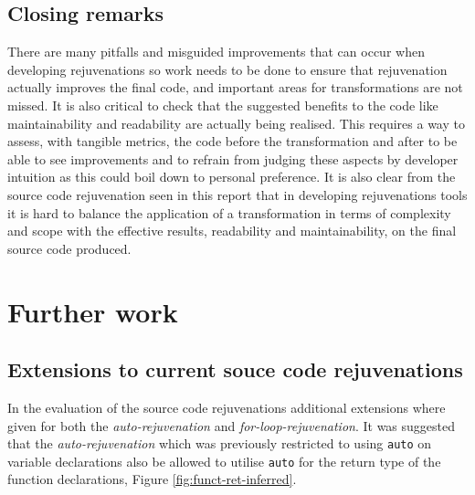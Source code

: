 \documentclass[bsc,frontabs,singlespacing,twoside,parskip,deptreport]{infthesis}
\begin{document}

\subsection{Closing remarks}
There are many pitfalls and misguided improvements that can occur when developing rejuvenations so work needs to be done to ensure that rejuvenation actually improves the final code, and important areas for transformations are not missed. It is also critical to check that the suggested benefits to the code like maintainability and readability are actually being realised. This requires a way to assess, with tangible metrics, the code before the transformation and after to be able to see improvements and to refrain from judging these aspects by developer intuition as this could boil down to personal preference. It is also clear from the source code rejuvenation seen in this report that in developing rejuvenations tools it is hard to balance the application of a transformation in terms of complexity and scope with the effective results, readability and maintainability, on the final source code produced. 


\section{Further work}

\subsection{Extensions to current souce code rejuvenations}
In the evaluation of the source code rejuvenations additional extensions where given for both the \textit{auto-rejuvenation} and  \textit{for-loop-rejuvenation}. It was suggested that the \textit{auto-rejuvenation} which was previously restricted to using \texttt{auto} on variable declarations also be allowed to utilise \texttt{auto} for the return type of the function declarations, Figure \ref{fig:funct-ret-inferred}.
\end{document}
